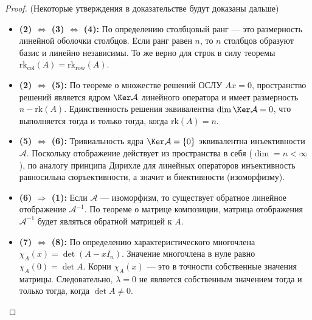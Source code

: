 \begin{proof}
	(Некоторые утверждения в доказательстве будут доказаны дальше)
	\begin{itemize}
		\item \textbf{(2) $\Leftrightarrow$ (3) $\Leftrightarrow$ (4):} По определению столбцовый ранг --- это размерность линейной оболочки столбцов. Если ранг равен $n$, то $n$ столбцов образуют базис и линейно независимы. То же верно для строк в силу теоремы $\mathrm{rk}_{\mathrm{col}}(A) = \mathrm{rk}_{\mathrm{row}}(A)$.
		
		\item \textbf{(2) $\Leftrightarrow$ (5):} По теореме о множестве решений ОСЛУ $Ax = 0$, пространство решений является ядром $\Ker\mathcal{A}$ линейного оператора и имеет размерность $n - \mathrm{rk}(A)$. Единственность решения эквивалентна $\dim\Ker\mathcal{A} = 0$, что выполняется тогда и только тогда, когда $\mathrm{rk}(A) = n$.
		
		\item \textbf{(5) $\Leftrightarrow$ (6):} Тривиальность ядра $\Ker\mathcal{A} = \{0\}$ эквивалентна инъективности $\mathcal{A}$. Поскольку отображение действует из пространства в себя ($\dim = n < \infty$), по аналогу принципа Дирихле для линейных операторов инъективность равносильна сюръективности, а значит и биективности (изоморфизму).
		
		\item \textbf{(6) $\Rightarrow$ (1):} Если $\mathcal{A}$ --- изоморфизм, то существует обратное линейное отображение $\mathcal{A}^{-1}$. По теореме о матрице композиции, матрица отображения $\mathcal{A}^{-1}$ будет являться обратной матрицей к $A$.
		
		\item \textbf{(7) $\Leftrightarrow$ (8):} По определению характеристического многочлена $\chi_A(x) = \det(A - xI_n)$. Значение многочлена в нуле равно $\chi_A(0) = \det A$. Корни $\chi_A(x)$ --- это в точности собственные значения матрицы. Следовательно, $\lambda = 0$ не является собственным значением тогда и только тогда, когда $\det A \neq 0$.
	\end{itemize}
\end{proof}
